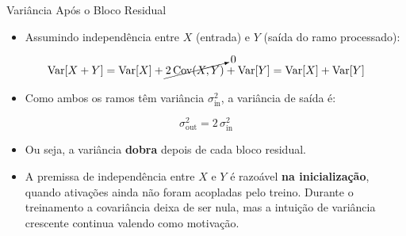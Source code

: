 \documentclass[aspectratio=169,xcolor=dvipsnames]{beamer}
\begin{document}
\begin{frame}{Variância Após o Bloco Residual}
\begin{itemize}
    \item Assumindo independência entre $X$ (entrada) e $Y$ (saída do ramo processado):
\end{itemize}
\begin{equation*}
    \mathrm{Var}[X+Y] = \mathrm{Var}[X] + \cancelto{0}{2\,\mathrm{Cov}(X,Y)} + \mathrm{Var}[Y] = \mathrm{Var}[X] + \mathrm{Var}[Y]
\end{equation*}
\vspace{0.2em}
\begin{itemize}
    \item Como ambos os ramos têm variância $\sigma_{\text{in}}^2$, a variância de saída é:
\end{itemize}
\begin{equation*}
    \sigma_{\text{out}}^2 = 2\,\sigma_{\text{in}}^2
\end{equation*}
\begin{itemize}
    \item Ou seja, a variância \textbf{dobra} depois de cada bloco residual.
    \item A premissa de independência entre $X$ e $Y$ é razoável \textbf{na inicialização}, quando ativações ainda não foram acopladas pelo treino. Durante o treinamento a covariância deixa de ser nula, mas a intuição de variância crescente continua valendo como motivação.
\end{itemize}
\end{frame}
\end{document}
